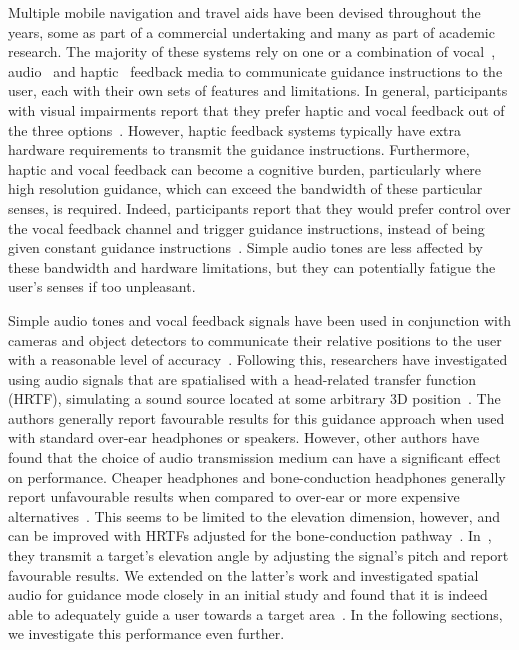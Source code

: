 \documentclass[]{interact}
\begin{document}
Multiple mobile navigation and travel aids have been devised throughout the years, some as part of a commercial undertaking and many as part of academic research.
The majority of these systems rely on one or a combination of vocal~\citep{mocanu2016when,chessa2016integrated,kanwal2015navigation}, audio~\citep{schwarze2015intuitive,rodriguez2012obstacle,katz2010navig} and haptic~\citep{rivera-rubio2015assistive,lee2015rgb,xiao2015assistive} feedback media to communicate guidance instructions to the user, each with their own sets of features and limitations.
In general, participants with visual impairments report that they prefer haptic and vocal feedback out of the three options~\citep{arditi2013user}.
However, haptic feedback systems typically have extra hardware requirements to transmit the guidance instructions.
Furthermore, haptic and vocal feedback can become a cognitive burden, particularly where high resolution guidance, which can exceed the bandwidth of these particular senses, is required.
Indeed, participants report that they would prefer control over the vocal feedback channel and trigger guidance instructions, instead of being given constant guidance instructions~\citep{arditi2013user}.
Simple audio tones are less affected by these bandwidth and hardware limitations, but they can potentially fatigue the user's senses if too unpleasant.

Simple audio tones and vocal feedback signals have been used in conjunction with cameras and object detectors to communicate their relative positions to the user with a reasonable level of accuracy~\citep{schauerte2012assistive,tian2013computer,fiannaca2014headlock,vazquez2012helping}.
Following this, researchers have investigated using audio signals that are spatialised with a head-related transfer function (HRTF), simulating a sound source located at some arbitrary 3D position~\citep{geronazzo2016interactive,wilson2007swan,katz2010navig,blum2013spatialized}.
The authors generally report favourable results for this guidance approach when used with standard over-ear headphones or speakers. 
However, other authors have found that the choice of audio transmission medium can have a significant effect on performance.
Cheaper headphones and bone-conduction headphones generally report unfavourable results when compared to over-ear or more expensive alternatives~\citep{schonstein2008comparison,macdonald2006spatial,stanley2006lateralization}. 
This seems to be limited to the elevation dimension, however, and can be improved with HRTFs adjusted for the bone-conduction pathway~\citep{stanley2006lateralization}.
In~\citep{durette2008visuo}, they transmit a target's elevation angle by adjusting the signal's pitch and report favourable results. 
We extended on the latter's work and investigated spatial audio for guidance mode closely in an initial study and found that it is indeed able to adequately guide a user towards a target area~\citep{lock2019bone}.
In the following sections, we investigate this performance even further. 
\end{document}
